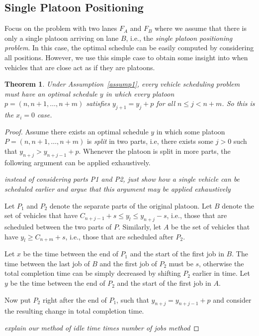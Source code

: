 \documentclass{article}
\theoremstyle{definition}
\theoremstyle{plain}
\newtheorem{theorem}{Theorem}[section]
\begin{document}
\subsection{Single Platoon Positioning}

Focus on the problem with two lanes $F_{A}$ and $F_{B}$ where we assume that
there is only a single platoon arriving on lane $B$, i.e., the \textit{single
  platoon positioning problem}. In this case, the optimal schedule can be easily
computed by considering all positions. However, we use this simple case to
obtain some insight into when vehicles that are close act as if they are
platoons.

\begin{theorem}
  Under Assumption~\ref{assump1}, every vehicle scheduling problem must have an
  optimal schedule $y$ in which every platoon $p=(n, n+1, \dots, n+m)$ satisfies
  $y_{j+1} = y_{j} + p$ for all $n \leq j < n + m$.
  \textit{\color{blue}So this is the $x_i=0$ case.}
\end{theorem}
\begin{proof}
  Assume there exists an optimal schedule $y$ in which some platoon
  $P=(n, n+1, \dots, n+m)$ is \textit{split} in two parts, i.e, there exists
  some $j > 0$ such that $y_{n+j} > y_{n+j-1} + p$. Whenever the platoon is
  split in more parts, the following argument can be applied exhaustively.

  \textit{\color{blue}instead of considering parts P1 and P2, just show how a
    single vehicle can be scheduled earlier and argue that this argument may be
    applied exhaustively}

  Let $P_{1}$ and $P_{2}$ denote the separate parts of the original platoon. Let
  $B$ denote the set of vehicles that have
  $C_{n+j-1} + s \leq y_{l} \leq y_{n+j} - s$, i.e., those that are scheduled
  between the two parts of $P$. Similarly, let $A$ be the set of vehicles that
  have $y_{l} \geq C_{n+m} + s$, i.e., those that are scheduled after $P_{2}$.

  Let $x$ be the time between the end of $P_{1}$ and the start of the first job
  in $B$. The time between the last job of $B$ and the first job of $P_{2}$ must
  be $s$, otherwise the total completion time can be simply decreased by
  shifting $P_{2}$ earlier in time. Let $y$ be the time between the end of
  $P_{2}$ and the start of the first job in $A$.

  Now put $P_{2}$ right after the end of $P_{1}$, such that
  $y_{n+j} = y_{n+j-1} + p$ and consider the resulting change in total
  completion time.

  \textit{\color{blue}explain our method of idle time times number of jobs method}
\end{proof}
\end{document}
